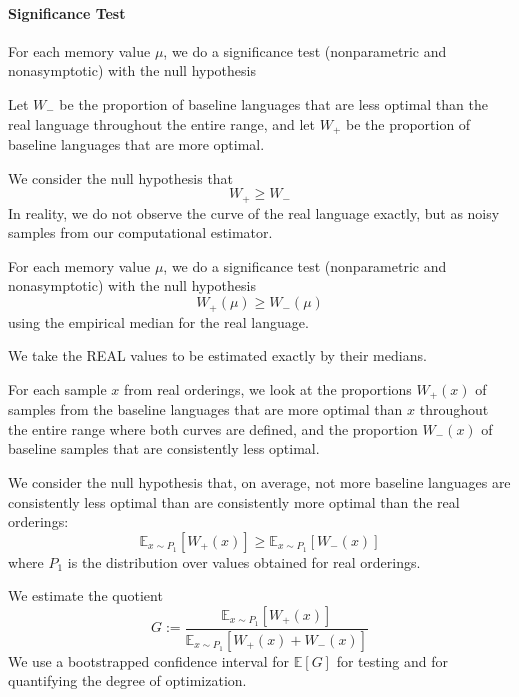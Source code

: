 \documentclass[11pt,letterpaper]{article}
\newcommand{\E}[0]{\mathbb{E}}
\begin{document}


\paragraph{Significance Test}
For each memory value $\mu$, we do a significance test (nonparametric and nonasymptotic) with the null hypothesis

Let $W_-$ be the proportion of baseline languages that are less optimal than the real language throughout the entire range, and let $W_+$ be the proportion of baseline languages that are more optimal.

We consider the null hypothesis that
\begin{equation}
	W_+ \geq W_-
\end{equation}
In reality, we do not observe the curve of the real language exactly, but as noisy samples from our computational estimator.




For each memory value $\mu$, we do a significance test (nonparametric and nonasymptotic) with the null hypothesis
\begin{equation}
	W_+(\mu) \geq W_-(\mu)
\end{equation}
using the empirical median for the real language.


We take the REAL values to be estimated exactly by their medians.





For each sample $x$ from real orderings, we look at the proportions $W_+(x)$ of samples from the baseline languages that are more optimal than $x$ throughout the entire range where both curves are defined, and the proportion $W_-(x)$ of baseline samples that are consistently less optimal.

We consider the null hypothesis that, on average, not more baseline languages are consistently less optimal than are consistently more optimal than the real orderings:
\begin{equation}
	\E_{x \sim P_1}[W_+(x)] \geq \E_{x \sim P_1}[W_-(x)]
\end{equation}
where $P_1$ is the distribution over values obtained for real orderings.

We estimate the quotient
\begin{equation}
	G :=	\frac{\E_{x \sim P_1}[W_+(x)]}{\E_{x \sim P_1}[W_+(x) + W_-(x)]}
\end{equation}
We use a bootstrapped confidence interval for $\E[G]$ for testing and for quantifying the degree of optimization.
\end{document}
